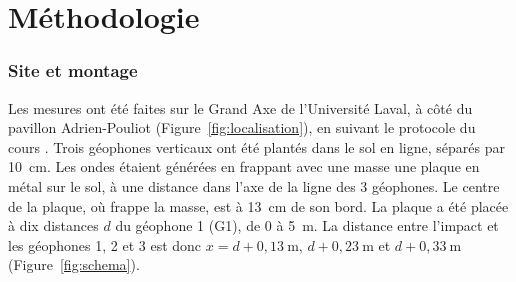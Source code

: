 \documentclass[11pt,letterpaper]{article}
\begin{document}
\section{Méthodologie}
\label{sec:methodologie}

\subsubsection*{Site et montage}
Les mesures ont été faites sur le Grand Axe de l'Université Laval, à côté du pavillon Adrien-Pouliot (Figure~\ref{fig:localisation}), en suivant le protocole du cours \cite{protocole}. Trois géophones verticaux ont été plantés dans le sol en ligne, séparés par 10~cm. Les ondes étaient générées en frappant avec une masse une plaque en métal sur le sol, à une distance dans l'axe de la ligne des 3 géophones. Le centre de la plaque, où frappe la masse, est à 13~cm de son bord. La plaque a été placée à dix distances $d$ du géophone 1 (G1), de 0 à 5~m. La distance entre l'impact et les géophones 1, 2 et 3 est donc $x = d + 0{,}13~\text{m}$, $d + 0{,}23~\text{m}$ et $d + 0{,}33~\text{m}$ (Figure~\ref{fig:schema}).
\end{document}
